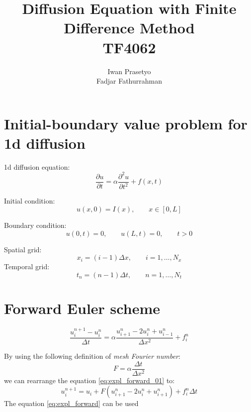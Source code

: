 \documentclass[a4paper,11pt]{article}
\begin{document}
\title{Diffusion Equation with Finite Difference Method \\
TF4062}
\author{Iwan Prasetyo \\
Fadjar Fathurrahman}
\date{}
\maketitle

\section{Initial-boundary value problem for 1d diffusion}

1d diffusion equation:
\begin{equation}
\frac{\partial u}{\partial t} = \alpha \frac{\partial^2 u}{\partial t^2} + f(x,t)
\end{equation}

Initial condition:
\begin{equation}
u(x,0) = I(x), \qquad x \in [0,L]
\end{equation}

Boundary condition:
\begin{equation}
u(0,t) = 0, \qquad u(L,t) = 0, \qquad t > 0
\end{equation}

Spatial grid:
\begin{equation}
x_{i} = (i-1)\Delta x, \qquad i = 1, \ldots, N_{x}
\end{equation}
Temporal grid:
\begin{equation}
t_{n} = (n-1)\Delta t, \qquad n = 1, \ldots, N_{t}
\end{equation}


\section{Forward Euler scheme}

\begin{equation}
\frac{u_{i}^{n+1} - u_{i}^{n}}{\Delta t} = \alpha \frac{u_{i+1}^{n} -2u_{i}^{n} + u_{i-1}^{n}}{\Delta x^2} + f_{i}^{n}
\label{eq:expl_forward_01}
\end{equation}

By using the following definition of \textit{mesh Fourier number}:
\begin{equation}
F = \alpha \frac{\Delta t}{\Delta x^2}
\end{equation}
we can rearrange the equation \eqref{eq:expl_forward_01} to:
\begin{equation}
u_{i}^{n+1} = u_{i} + F\left( u_{i+1}^{n} - 2u_{i}^{n} + u_{i+1}^{n} \right) +
f_{i}^{n}\Delta t
\label{eq:expl_forward}
\end{equation}
The equation \eqref{eq:expl_forward} can be used 
\end{document}
